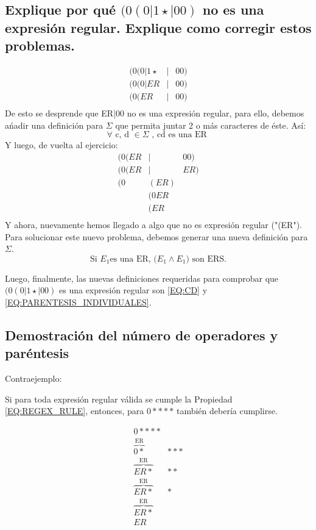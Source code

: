 \documentclass[11pt]{utalcaDoc}
\numberwithin{equation}{section}
\begin{document}
\subsection{Explique por qué $(0(0|1\star|00)$ no es una expresión regular. Explique como corregir estos problemas.}
 \begin{eqnarray*}
 	(0( 0| 1\star &|& 00)\\
 	(0( 0|ER &|& 00)\\
 	(0( ER &|& 00)\\
 \end{eqnarray*}
	De esto se desprende que ER|00 no es una expresión regular, para ello, debemos ańadir una definición para $\Sigma$ que permita juntar 2 o más caracteres de éste. Así:
 \begin{equation}
 	\forall \text{ c, d } \in \Sigma \text{ , cd es una ER }
 \end{equation} \label{EQ:CD}
	Y luego, de vuelta al ejercicio:
 \begin{eqnarray*}
 	(0(ER&|&00)\\
 	(0(ER&|&ER)\\
 	(0&(ER)&\\
 	&(0ER&\\
 	&(ER&\\
 \end{eqnarray*}
 	Y ahora, nuevamente hemos llegado a algo que no es expresión regular ("(ER"). Para solucionar este nuevo problema, debemos generar una nueva definición para $\Sigma$.
 \begin{equation}
 	\text{Si } E_1 \text{es una ER, (}E_1 \wedge E_1\text{)} \text{ son ERS.}
 \end{equation}\label{EQ:PARENTESIS_INDIVIDUALES}
 
 Luego, finalmente, las nuevas definiciones requeridas para comprobar que $(0(0|1\star|00)$ es una expresión regular son \ref{EQ:CD} y \ref{EQ:PARENTESIS_INDIVIDUALES}.

\subsection{Demostración del número de operadores y paréntesis}
Contraejemplo:

Si para toda expresión regular válida se cumple la Propiedad \ref{EQ:REGEX_RULE}, entonces, para $0****$ también debería cumplirse.

\begin{align}
0****\label{EQ:REGEX_00}\\
\overbrace{0*}^\text{ER}&*** \label{EQ:REGEX_01}\\
\overbrace{ER*}^\text{ER}&** \nonumber\\
\overbrace{ER*}^\text{ER}&* \nonumber\\
\overbrace{ER*}^\text{ER}& \nonumber\\
ER&\nonumber
\end{align}
\end{document}
